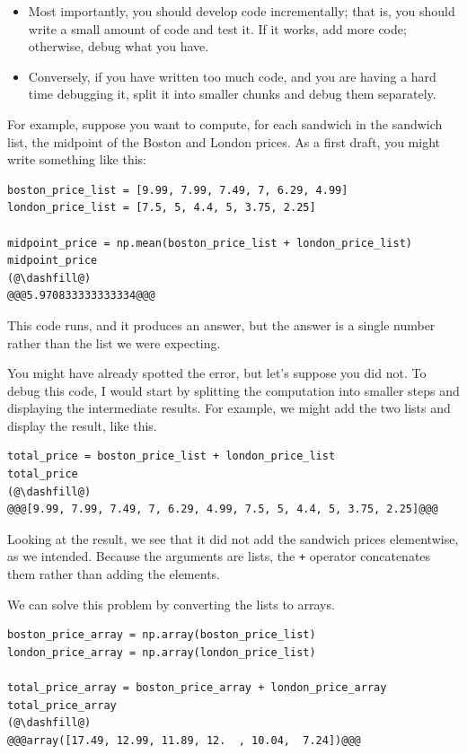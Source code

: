 \begin{itemize}
\item
  Most importantly, you should develop code incrementally; that is, you
  should write a small amount of code and test it. If it works, add more
  code; otherwise, debug what you have.
\item
  Conversely, if you have written too much code, and you are having a
  hard time debugging it, split it into smaller chunks and debug them
  separately.
\end{itemize}

For example, suppose you want to compute, for each sandwich in the
sandwich list, the midpoint of the Boston and London prices. As a first
draft, you might write something like this:

\begin{lstlisting}[]
boston_price_list = [9.99, 7.99, 7.49, 7, 6.29, 4.99]
london_price_list = [7.5, 5, 4.4, 5, 3.75, 2.25]

midpoint_price = np.mean(boston_price_list + london_price_list)
midpoint_price
(@\dashfill@)
@@@5.970833333333334@@@
\end{lstlisting}

This code runs, and it produces an answer, but the answer is a single
number rather than the list we were expecting.

You might have already spotted the error, but let's suppose you did not.
To debug this code, I would start by splitting the computation into
smaller steps and displaying the intermediate results. For example, we
might add the two lists and display the result, like this.

\begin{lstlisting}[]
total_price = boston_price_list + london_price_list
total_price
(@\dashfill@)
@@@[9.99, 7.99, 7.49, 7, 6.29, 4.99, 7.5, 5, 4.4, 5, 3.75, 2.25]@@@
\end{lstlisting}

Looking at the result, we see that it did not add the sandwich prices
elementwise, as we intended. Because the arguments are lists, the
\passthrough{\lstinline!+!} operator concatenates them rather than
adding the elements.

We can solve this problem by converting the lists to arrays.

\begin{lstlisting}[]
boston_price_array = np.array(boston_price_list)
london_price_array = np.array(london_price_list)

total_price_array = boston_price_array + london_price_array
total_price_array
(@\dashfill@)
@@@array([17.49, 12.99, 11.89, 12.  , 10.04,  7.24])@@@
\end{lstlisting}

